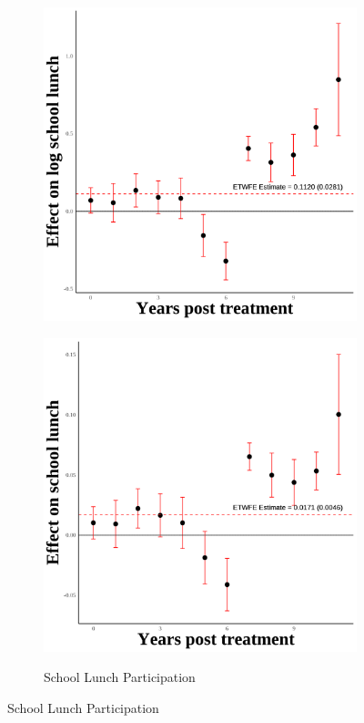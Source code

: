 \documentclass[12pt,english]{article}
\begin{document}
\begin{figure}[H]
\begin{subfigure}[b]{0.3\textwidth}
    \includegraphics[width=\linewidth]{figures/plot35-ln_schl_lunch_event_study-secgen-hw.png}
    \label{fig:ln-schl-lunch-secgen-hw}
  \end{subfigure}
  \hfill
  \begin{subfigure}[b]{0.3\textwidth}
    \centering
    \caption{School Lunch Participation}
    \includegraphics[width=\linewidth]{figures/plot36-schl_lunch_event_study-secgen-hw.png}
    \label{fig:schl-lunch-secgen-hw}
  \end{subfigure}


\end{figure}
\end{document}
